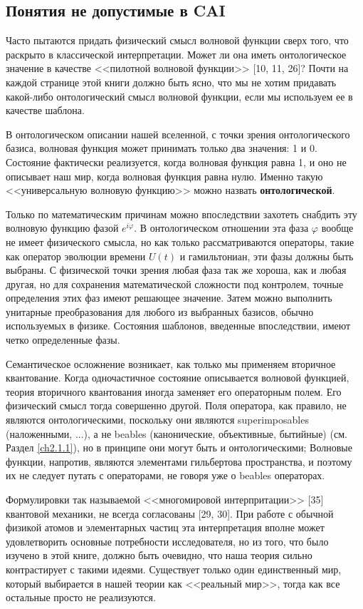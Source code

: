 \documentclass[main.tex]{subfiles}
\begin{document}
\subsection{Понятия не допустимые в CAI}\label{ch3.3}

Часто пытаются придать физический смысл волновой функции сверх того, что раскрыто в классической интерпретации. Может ли она иметь онтологическое значение в качестве <<пилотной волновой функции>> [10, 11, 26]? Почти на каждой странице этой книги должно быть ясно, что мы не хотим придавать какой-либо онтологический смысл волновой функции, если мы используем ее в качестве шаблона.

В онтологическом описании нашей вселенной, с точки зрения онтологического базиса, волновая функция может принимать только два значения: 1 и 0. Состояние фактически реализуется, когда волновая функция равна 1, и оно не описывает наш мир, когда волновая функция равна нулю. Именно такую <<универсальную волновую функцию>> можно назвать \textbf{онтологической}.

Только по математическим причинам можно впоследствии захотеть снабдить эту волновую функцию фазой $e^{i\varphi}$. В онтологическом отношении эта фаза $\varphi$ вообще не имеет физического смысла, но как только рассматриваются операторы, такие как оператор эволюции времени $U(t)$ и гамильтониан, эти фазы должны быть выбраны. С физической точки зрения любая фаза так же хороша, как и любая другая, но для сохранения математической сложности под контролем, точные определения этих фаз имеют решающее значение. Затем можно выполнить унитарные преобразования для любого из выбранных базисов, обычно используемых в физике. Состояния шаблонов, введенные впоследствии, имеют четко определенные фазы.

Семантическое осложнение возникает, как только мы применяем вторичное квантование. Когда одночастичное состояние описывается волновой функцией, теория вторичного квантования иногда заменяет его операторным полем. Его физический смысл тогда совершенно другой. Поля оператора, как правило, не являются онтологическими, поскольку они являются superimposables (наложенными, ...), а не beables (канонические, объективные, бытийные) (см. Раздел \ref{ch2.1.1}), но в принципе они могут быть и онтологическими; Волновые функции, напротив, являются элементами гильбертова пространства, и поэтому их не следует путать с операторами, не говоря уже о beables операторах.

Формулировки так называемой <<многомировой интерпритации>> [35] квантовой механики, не всегда согласованы [29, 30]. При работе с обычной физикой атомов и элементарных частиц эта интерпретация вполне может удовлетворить основные потребности исследователя, но из того, что было изучено в этой книге, должно быть очевидно, что наша теория сильно контрастирует с такими идеями. Существует только один единственный мир, который выбирается в нашей теории как <<реальный мир>>, тогда как все остальные просто не реализуются.
\end{document}
